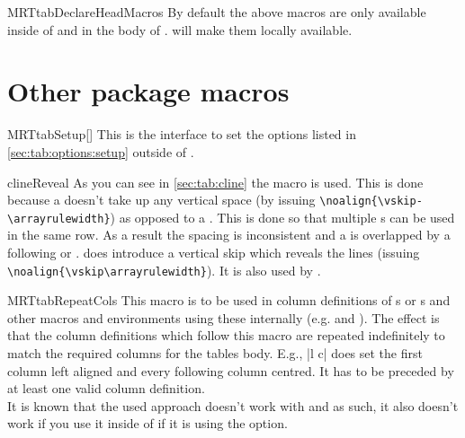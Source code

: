 \begin{describemacro}{MRTtabDeclareHeadMacros}%
  By default the above macros are only available inside of  and
  in the body of .  will make them
  locally available.
\end{describemacro}%

\section{Other package macros}%
\begin{describemacro}{MRTtabSetup}[]
  This is the interface to set the options listed in
  \autoref{sec:tab:options:setup} outside of .
\end{describemacro}

\begin{describemacro}{clineReveal}
  As you can see in \autoref{sec:tab:cline} the macro  is used.
  This is done because a  doesn't take up any vertical space (by
  issuing \verb|\noalign{\vskip-\arrayrulewidth}|) as opposed to a .
  This is done so that multiple s can be used in the same row. As a
  result the spacing is inconsistent and a  is overlapped by a
  following  or .  does introduce a
  vertical skip which reveals the lines (issuing
  \verb|\noalign{\vskip\arrayrulewidth}|).  It is also used by .
\end{describemacro}

\begin{describemacro}{MRTtabRepeatCols}
  This macro is to be used in column definitions of s or
  s and other macros and environments using these internally (e.g.
   and ). The effect is that the column
  definitions which follow this macro are repeated indefinitely to match the
  required columns for the tables body. E.g., \bverb|l \MRTtabRepeatCols c| does
  set the first column left aligned and every following column centred. It has
  to be preceded by at least one valid column definition.\\[\parskip]
  \dangerleft
  It is known that the used approach doesn't work with  and as
  such, it also doesn't work if you use it inside of  if it is
  using the  option.
\end{describemacro}

